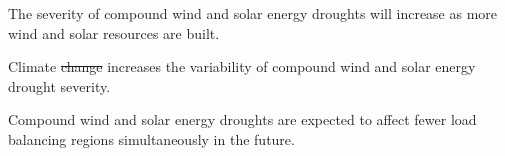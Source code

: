 \documentclass{agujournal2019}
\providecommand{\DIFadd}[1]{{\protect\color{blue}\uwave{#1}}} %
\providecommand{\DIFdel}[1]{{\protect\color{red}\sout{#1}}} %
\providecommand{\DIFaddbegin}{} %
\providecommand{\DIFaddend}{} %
\providecommand{\DIFdelbegin}{} %
\providecommand{\DIFdelend}{} %
\begin{document}






\begin{keypoints}
\item The severity of compound wind and solar energy droughts will increase as more wind and solar resources are built. 
\item Climate \DIFdelbegin \DIFdel{change }\DIFdelend increases the variability of \DIFaddbegin \DIFadd{future }\DIFaddend compound wind and solar energy drought severity. 
\item Compound wind and solar energy droughts are expected to affect fewer load balancing regions simultaneously in the future.
\end{keypoints}

%
%

%
%
\end{document}
